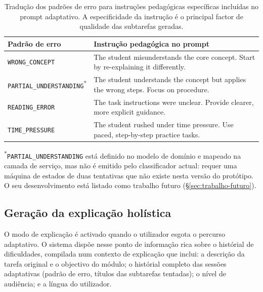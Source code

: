 \begin{table}[htbp]
	\centering
	\small
	\begin{tabular}{p{4.2cm} p{7.7cm}}
		\toprule
		\textbf{Padr\~ao de erro} & \textbf{Instru\c{c}\~ao pedag\'ogica no prompt} \\
		\midrule
		\texttt{WRONG\_CONCEPT}
			& The student misunderstands the core concept. Start by re-explaining it differently. \\
		\texttt{PARTIAL\_UNDERSTANDING}\textsuperscript{*}
			& The student understands the concept but applies the wrong steps. Focus on procedure. \\
		\texttt{READING\_ERROR}
			& The task instructions were unclear. Provide clearer, more explicit guidance. \\
		\texttt{TIME\_PRESSURE}
			& The student rushed under time pressure. Use paced, step-by-step practice tasks. \\
		\bottomrule
	\end{tabular}
	\caption[Mapeamento de padr\~oes de erro para instru\c{c}\~oes pedag\'ogicas no prompt]{Tradu\c{c}\~ao dos padr\~oes de erro para instru\c{c}\~oes pedag\'ogicas espec\'ificas inclu\'idas no prompt adaptativo. A especificidade da instru\c{c}\~ao \'e o principal factor de qualidade das subtarefas geradas.}
	\label{tab:error-patterns}
\end{table}
\noindent\textsuperscript{*}\small\texttt{PARTIAL\_UNDERSTANDING} est\'a definido no modelo de dom\'inio e mapeado na camada de servi\c{c}o, mas n\~ao \'e emitido pelo classificador actual: requer uma m\'aquina de estados de duas tentativas que n\~ao existe nesta vers\~ao do prot\'otipo. O seu desenvolvimento est\'a listado como trabalho futuro (\S\ref{sec:trabalho-futuro}).\normalsize

\subsection{Gera\c{c}\~ao da explica\c{c}\~ao hol\'istica}
\label{ssec:ia-explicacao}

O modo de explica\c{c}\~ao \'e activado quando o utilizador esgota o percurso
adaptativo. O sistema disp\~oe nesse ponto de informa\c{c}\~ao rica sobre o
hist\'orial de dificuldades, compilada num contexto de explica\c{c}\~ao que
inclui: a descri\c{c}\~ao da tarefa original e o objectivo do m\'odulo; o
hist\'orial completo das sess\~oes adaptativas (padr\~ao de erro, t\'itulos
das subtarefas tentadas); o n\'ivel de audi\^encia; e a l\'ingua do utilizador.

